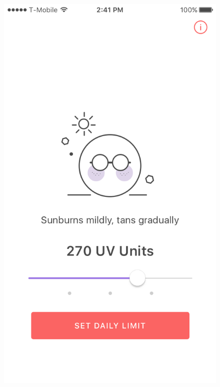 \documentclass[12pt,openany,a4paper]{book}
\begin{document}
\begin{figure}[h]
\includegraphics[width=\textwidth]{ShadeOnboarding.png}
\end{figure}
\end{document}
